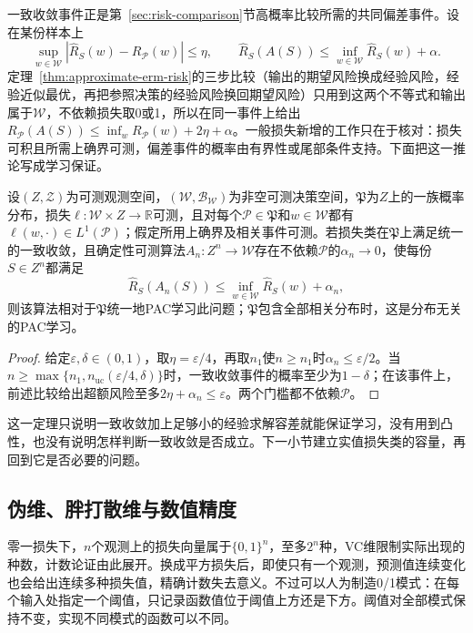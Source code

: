 一致收敛事件正是第~\ref{sec:risk-comparison}节高概率比较所需的共同偏差事件。设在某份样本上
\[
 \sup_{w\in\mathcal W}|\hat R_S(w)-R_{\mathcal P}(w)|\leq\eta,\qquad
 \hat R_S(A(S))\leq\inf_{w\in\mathcal W}\hat R_S(w)+\alpha .
\]
定理~\ref{thm:approximate-erm-risk}的三步比较（输出的期望风险换成经验风险，经验近似最优，再把参照决策的经验风险换回期望风险）只用到这两个不等式和输出属于$\mathcal W$，不依赖损失取0或1，所以在同一事件上给出$R_{\mathcal P}(A(S))\leq\inf_wR_{\mathcal P}(w)+2\eta+\alpha$。一般损失新增的工作只在于核对：损失可积且所需上确界可测，偏差事件的概率由有界性或尾部条件支持。下面把这一推论写成学习保证。

\begin{theorem}[一致收敛推出一般学习保证]
\label{thm:general-uniform-pac}
设$(Z,\mathcal Z)$为可测观测空间，$(\mathcal W,\mathcal B_{\mathcal W})$为非空可测决策空间，$\mathfrak P$为$Z$上的一族概率分布，损失$\ell:\mathcal W\times Z\to\mathbb R$可测，且对每个$\mathcal P\in\mathfrak P$和$w\in\mathcal W$都有$\ell(w,\cdot)\in L^1(\mathcal P)$；假定所用上确界及相关事件可测。若损失类在$\mathfrak P$上满足统一的一致收敛，且确定性可测算法$A_n:Z^n\to\mathcal W$存在不依赖$\mathcal P$的$\alpha_n\to0$，使每份$S\in Z^n$都满足
\[
 \hat R_S(A_n(S))\leq\inf_{w\in\mathcal W}\hat R_S(w)+\alpha_n,
\]
则该算法相对于$\mathfrak P$统一地PAC学习此问题；$\mathfrak P$包含全部相关分布时，这是分布无关的PAC学习。
\end{theorem}
\begin{proof}
给定$\varepsilon,\delta\in(0,1)$，取$\eta=\varepsilon/4$，再取$n_1$使$n\geq n_1$时$\alpha_n\leq\varepsilon/2$。当$n\geq\max\{n_1,n_{\mathrm{uc}}(\varepsilon/4,\delta)\}$时，一致收敛事件的概率至少为$1-\delta$；在该事件上，前述比较给出超额风险至多$2\eta+\alpha_n\leq\varepsilon$。两个门槛都不依赖$\mathcal P$。
\end{proof}

这一定理只说明一致收敛加上足够小的经验求解容差就能保证学习，没有用到凸性，也没有说明怎样判断一致收敛是否成立。下一小节建立实值损失类的容量，再回到它是否必要的问题。
\subsection{伪维、胖打散维与数值精度}
\label{sec:comb-real-valued-threshold-margins}
\label{sec:comb-threshold-patterns}
\label{sec:comb-margin-patterns}

零一损失下，$n$个观测上的损失向量属于$\{0,1\}^n$，至多$2^n$种，VC维限制实际出现的种数，计数论证由此展开。换成平方损失后，即使只有一个观测，预测值连续变化也会给出连续多种损失值，精确计数失去意义。不过可以人为制造0/1模式：在每个输入处指定一个阈值，只记录函数值位于阈值上方还是下方。阈值对全部模式保持不变，实现不同模式的函数可以不同。

